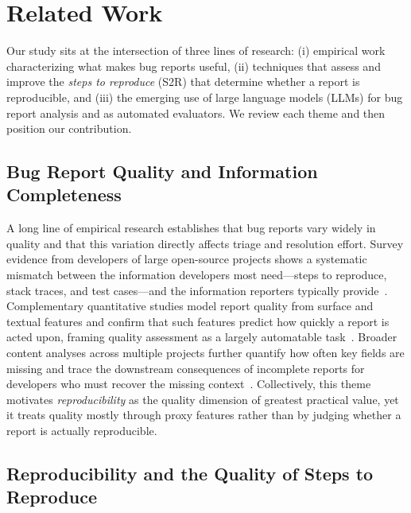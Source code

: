 \section{Related Work}
\label{sec:related}

Our study sits at the intersection of three lines of research: (i) empirical
work characterizing what makes bug reports useful, (ii) techniques that assess
and improve the \emph{steps to reproduce} (S2R) that determine whether a report
is reproducible, and (iii) the emerging use of large language models (LLMs) for
bug report analysis and as automated evaluators. We review each theme and then
position our contribution.

\subsection{Bug Report Quality and Information Completeness}
\label{sec:related:quality}

A long line of empirical research establishes that bug reports vary widely in
quality and that this variation directly affects triage and resolution effort.
Survey evidence from developers of large open-source projects shows a systematic
mismatch between the information developers most need---steps to reproduce,
stack traces, and test cases---and the information reporters typically
provide~\cite{zimmermann2010good}. Complementary quantitative studies model
report quality from surface and textual features and confirm that such features
predict how quickly a report is acted upon, framing quality assessment as a
largely automatable task~\cite{hooimeijer2007modeling}. Broader content analyses
across multiple projects further quantify how often key fields are missing and
trace the downstream consequences of incomplete reports for developers who must
recover the missing context~\cite{davies2014whats}. Collectively, this theme
motivates \emph{reproducibility} as the quality dimension of greatest practical
value, yet it treats quality mostly through proxy features rather than by
judging whether a report is actually reproducible.

\subsection{Reproducibility and the Quality of Steps to Reproduce}
\label{sec:related:s2r}

